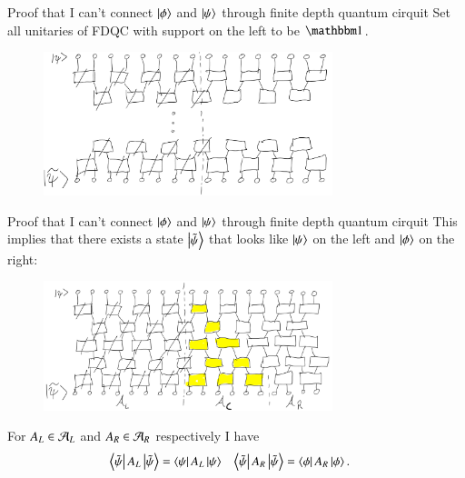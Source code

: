 \documentclass{beamer}
\begin{document}
\begin{frame}{Proof that I can't connect $\ket{\phi}$ and $\ket{\psi}$ through finite depth quantum cirquit}
	Set all unitaries of FDQC with support on the left to be $\id$.
	\begin{figure}
		\center
		\includegraphics[width=0.75\textwidth]{Figures/ConnectingPsiAndPsi0Proof2.png}
	\end{figure}
\end{frame}

\begin{frame}{Proof that I can't connect $\ket{\phi}$ and $\ket{\psi}$ through finite depth quantum cirquit}
	This implies that there exists a state $\ket{\tilde\psi}$ that looks like $\ket{\psi}$ on the left and $\ket{\phi}$ on the right:
	\begin{figure}
		\center
		\includegraphics[width=0.75\textwidth]{Figures/ConnectingPsiAndPsi0Proof2_WithLightcone.png}
	\end{figure}
	\pause
	For $A_L\in\AA_L$ and $A_R\in\AA_R$ respectively I have
	\begin{align}
		\bra{\tilde\psi}A_L\ket{\tilde{\psi}}&=\bra{\psi}A_L\ket{\psi}&\bra{\tilde\psi}A_R\ket{\tilde{\psi}}&=\bra{\phi}A_R\ket{\phi}.
	\end{align}
\end{frame}
\end{document}
